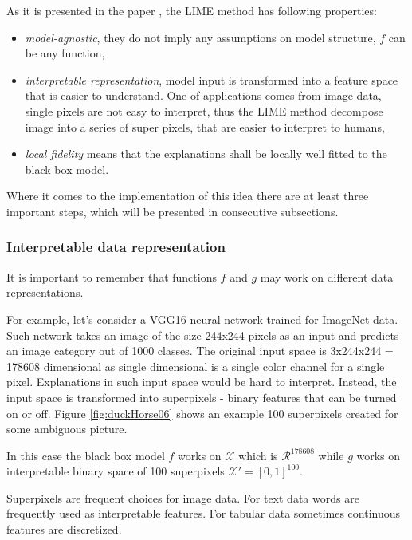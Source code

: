 \documentclass[12pt,]{krantz}
\providecommand{\tightlist}{%
  \setlength{\itemsep}{0pt}\setlength{\parskip}{0pt}}
\theoremstyle{definition}
\theoremstyle{definition}
\theoremstyle{definition}
\theoremstyle{remark}
\begin{document}
As it is presented in the paper \citep{lime}, the LIME method has
following properties:

\begin{itemize}
\tightlist
\item
  \emph{model-agnostic}, they do not imply any assumptions on model
  structure, \(f\) can be any function,
\item
  \emph{interpretable representation}, model input is transformed into a
  feature space that is easier to understand. One of applications comes
  from image data, single pixels are not easy to interpret, thus the
  LIME method decompose image into a series of super pixels, that are
  easier to interpret to humans,
\item
  \emph{local fidelity} means that the explanations shall be locally
  well fitted to the black-box model.
\end{itemize}

Where it comes to the implementation of this idea there are at least
three important steps, which will be presented in consecutive
subsections.

\hypertarget{interpretable-data-representation}{%
\subsubsection{Interpretable data
representation}\label{interpretable-data-representation}}

It is important to remember that functions \(f\) and \(g\) may work on
different data representations.

For example, let's consider a VGG16 neural network trained for ImageNet
data. Such network takes an image of the size 244x244 pixels as an input
and predicts an image category out of 1000 classes. The original input
space is 3x244x244 = 178608 dimensional as single dimensional is a
single color channel for a single pixel. Explanations in such input
space would be hard to interpret. Instead, the input space is
transformed into superpixels - binary features that can be turned on or
off. Figure \ref{fig:duckHorse06} shows an example 100 superpixels
created for some ambiguous picture.

In this case the black box model \(f\) works on \(\mathcal X\) which is
\(\mathcal R^{178608}\) while \(g\) works on interpretable binary space
of 100 superpixels \(\mathcal X' = [0,1]^{100}\).

Superpixels are frequent choices for image data. For text data words are
frequently used as interpretable features. For tabular data sometimes
continuous features are discretized.
\end{document}
